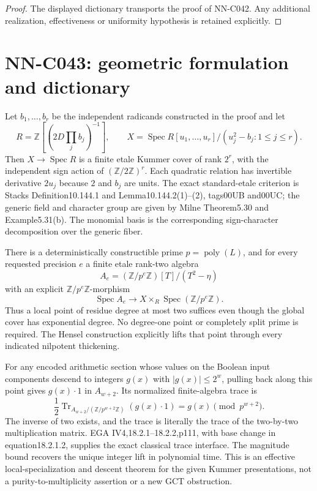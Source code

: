\begin{proof} The displayed dictionary transports the proof of NN-C042. Any additional realization, effectiveness or uniformity hypothesis is retained explicitly.\end{proof}


\section{NN-C043: geometric formulation and dictionary}
\begin{geometricstatement}[NN-C043]
Let $b_1,\ldots,b_r$ be the independent radicands constructed in the proof and let
\[
 R=\mathbb Z[(2D\prod_j b_j)^{-1}],\qquad
 X=\operatorname{Spec}
     R[u_1,\ldots,u_r]/(u_j^2-b_j:1\le j\le r).
\]
Then $X\to\operatorname{Spec}R$ is a finite etale Kummer cover of rank $2^r$, with the independent sign action of $(\mathbb Z/2\mathbb Z)^r$. Each quadratic relation has invertible derivative $2u_j$ because $2$ and $b_j$ are units. The exact standard-etale criterion is Stacks Definition10.144.1 and Lemma10.144.2(1)--(2), tags00UB and00UC; the generic field and character group are given by Milne Theorem5.30 and Example5.31(b). The monomial basis is the corresponding sign-character decomposition over the generic fiber.

There is a deterministically constructible prime $p=\operatorname{poly}(L)$, and for every requested precision $e$ a finite etale rank-two algebra
\[
 A_e=(\mathbb Z/p^e\mathbb Z)[T]/(T^2-\eta)
\]
with an explicit $\mathbb Z/p^e\mathbb Z$-morphism
\[
       \operatorname{Spec}A_e
              \longrightarrow X\times_R\operatorname{Spec}(\mathbb Z/p^e\mathbb Z).
\]
Thus a local point of residue degree at most two suffices even though the global cover has exponential degree. No degree-one point or completely split prime is required. The Hensel construction explicitly lifts that point through every indicated nilpotent thickening.

For any encoded arithmetic section whose values on the Boolean input components descend to integers $g(x)$ with $|g(x)|\le2^w$, pulling back along this point gives $g(x)\cdot1$ in $A_{w+2}$. Its normalized finite-algebra trace is
\[
              \frac12\operatorname{Tr}_{A_{w+2}/(\mathbb Z/p^{w+2}\mathbb Z)}
                           (g(x)\cdot1)
                    =g(x)\pmod{p^{w+2}}.
\]
The inverse of two exists, and the trace is literally the trace of the two-by-two multiplication matrix. EGA IV4,18.2.1--18.2.2,p111, with base change in equation18.2.1.2, supplies the exact classical trace interface. The magnitude bound recovers the unique integer lift in polynomial time. This is an effective local-specialization and descent theorem for the given Kummer presentations, not a purity-to-multiplicity assertion or a new GCT obstruction.


\end{geometricstatement}
